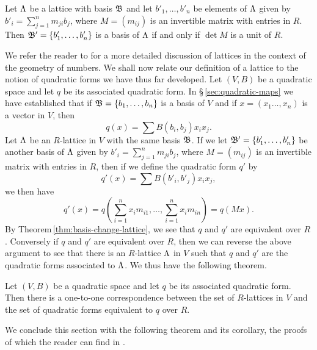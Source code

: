 \begin{theoremx}
    \label{thm:basis-change-lattice}
    Let \(\Lambda\) be a lattice with basis \(\mathfrak{B}\) and let \(b'_1, \dots, b'_n\) be elements of \(\Lambda\) given by \(b'_i = \sum_{j=1}^n m_{ji} b_j\), where \(M = (m_{ij})\) is an invertible matrix with entries in \(R\). Then \(\mathfrak{B}' = \{b'_1, \dots, b'_n\}\) is a basis of \(\Lambda\) if and only if \(\det M\) is a unit of \(R\).
\end{theoremx}

We refer the reader to \cite[pp.\,4--20]{cassels1961geometry} for a more detailed discussion of lattices in the context of the geometry of numbers. We shall now relate our definition of a lattice to the notion of quadratic forms we have thus far developed. Let \((V,B)\) be a quadratic space and let \(q\) be its associated quadratic form. In \S\,\ref{sec:quadratic-maps} we have established that if \(\mathfrak{B} = \{b_1, \dots, b_n \}\) is a basis of \(V\) and if \(x = (x_1 \dots, x_n)\) is a vector in \(V\), then
\[
    q(x) = \sum B(b_i, b_j) x_i x_j.
\]
Let \(\Lambda\) be an \(R\)-lattice in \(V\) with the same basis \(\mathfrak{B}\). If we let \(\mathfrak{B}' = \{b'_1, \dots, b'_n\}\) be another basis of \(\Lambda\) given by \(b'_i = \sum_{j=1}^n m_{ji} b_j\), where \(M = (m_{ij})\) is an invertible matrix with entries in \(R\), then if we define the quadratic form \(q'\) by
\[
    q'(x) = \sum B(b'_i, b'_j) x_i x_j,
\]
we then have
\[
    q'(x) = q\left(\sum_{i=1}^n x_i m_{i1}, \dots, \sum_{i=1}^n x_i m_{in}\right) = q(Mx).
\]
By Theorem\,\ref{thm:basis-change-lattice}, we see that \(q\) and \(q'\) are equivalent over \(R\). Conversely if \(q\) and \(q'\) are equivalent over \(R\), then we can reverse the above argument to see that there is an \(R\)-lattice \(\Lambda\) in \(V\) such that \(q\) and \(q'\) are the quadratic forms associated to \(\Lambda\). We thus have the following theorem.

\begin{theoremx}
    \label{thm:quadratic-form-lattice}
    Let \((V,B)\) be a quadratic space and let \(q\) be its associated quadratic form. Then there is a one-to-one correspondence between the set of \(R\)-lattices in \(V\) and the set of quadratic forms equivalent to \(q\) over \(R\).
\end{theoremx}

We conclude this section with the following theorem and its corollary, the proofs of which the reader can find in \cite[p.\,106--108]{cassels2008rational}.

